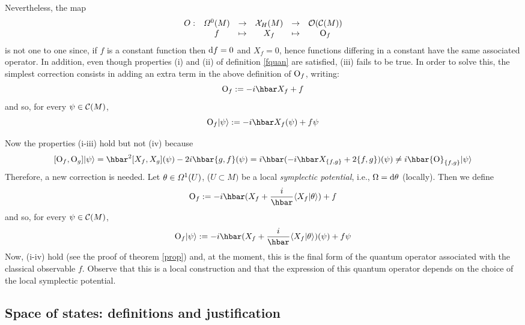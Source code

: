 \documentclass[12pt]{article}
\theoremstyle{plain}
\def\beq{\begin{equation}}
\def\eeq{\end{equation}}
\def\d{{\rm d}}
\def\C{{\cal C}}
\def\sta{|\psi \rangle }
\def\Op{{\rm O}}
\begin{document}
\noindent Nevertheless, the map
$$
\begin{array}{cccccc}
O:&{\mit\Omega}^0 (M)&\to &{\cal X}_H(M)&\to &{\cal O}(\C (M))
\\
&f& \mapsto &X_f& \mapsto &\Op_f
\end{array}
$$
is not one to one since,
if $f$ is a constant function
then $\d f = 0$ and $X_f=0$,
hence functions differing in a constant
have the same associated operator.
In addition, even though properties (i) and (ii) of definition
\ref{fquan}
are satisfied, (iii) fails to be true.
In order to solve this,
the simplest correction consists in adding
an extra term in the above definition of
$\Op_f$, writing:
$$
\Op_f := -i\hbar X_f + f
$$
and so, for every $\psi \in \C (M)$,
$$
\Op_f\sta := -i\hbar X_f(\psi) +f\psi
$$

\noindent Now the properties (i-iii) hold but not (iv) because $$
[\Op_f,\Op_g]\sta = \hbar^2 [X_f,X_g](\psi) - 2i\hbar \{ g,f\}
(\psi )= i\hbar (-i\hbar X_{\{ f,g\}} + 2\{ f,g\} )(\psi) \not=
i\hbar \Op_{\{ f,g\}}\sta $$ Therefore, a new correction is
needed. Let $\theta \in {\mit\Omega}^1(U)$, ($U\subset M)$ be a
local {\it symplectic potential}, i.e., $\Omega = \d \theta$
(locally). Then we define \beq \Op_f := -i\hbar (X_f +
\frac{i}{\hbar}\langle X_f |\theta \rangle )+f \label{oper} \eeq
and so, for every $\psi \in \C (M)$, \beq \Op_f\sta := -i\hbar
(X_f + \frac{i}{\hbar}\langle X_f |\theta \rangle ) (\psi )+f\psi
\label{opersta} \eeq
Now, (i-iv) hold (see the proof of theorem \ref{prop})
and, at the moment, this is the final form of the quantum operator
associated with the classical observable $f$.
Observe that this is a local construction
and that the expression of this quantum operator
depends on the choice of the local symplectic potential.



\subsection{Space of states: definitions and justification}
\end{document}

